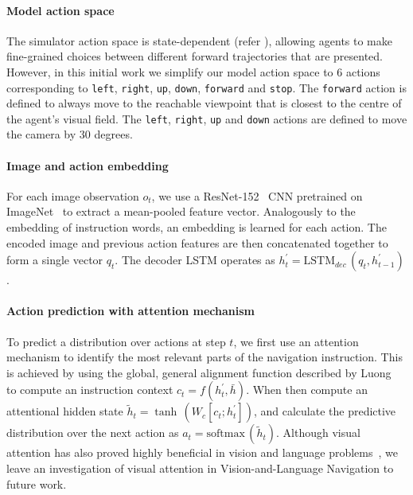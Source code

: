 \documentclass[10pt,twocolumn,letterpaper]{article}
\begin{document}
\vspace{-0.3cm}
\paragraph{Model action space}

The simulator action space is state-dependent (refer ), allowing agents to make fine-grained choices between different forward trajectories that are presented. However, in this initial work we simplify our model action space to 6 actions corresponding to \texttt{left}, \texttt{right}, \texttt{up}, \texttt{down}, \texttt{forward} and \texttt{stop}. The \texttt{forward} action is defined to always move to the reachable viewpoint that is closest to the centre of the agent's visual field. The \texttt{left}, \texttt{right}, \texttt{up} and \texttt{down} actions are defined to move the camera by 30 degrees.

\vspace{-0.3cm}
\paragraph{Image and action embedding}

For each image observation $o_t$, we use a ResNet-152~\cite{he2015deep} CNN pretrained on ImageNet~\cite{ILSVRC15} to extract a mean-pooled feature vector. Analogously to the embedding of instruction words, an embedding is learned for each action. The encoded image and previous action features are then concatenated together to form a single vector $q_t$. The decoder LSTM operates as $h^{'}_t= \textrm{LSTM}_{dec}\,(q_t,h^{'}_{t-1})$. 

\vspace{-0.3cm}
\paragraph{Action prediction with attention mechanism}

To predict a distribution over actions at step $t$, we first use an attention mechanism to identify the most relevant parts of the navigation instruction. This is achieved by using the global, general alignment function described by Luong \etal~\cite{luong2015effective} to compute an instruction context $c_t = f(h^{'}_t, \bar{h})$. When then compute an attentional hidden state $\tilde{h}_t = \tanh\,(W_c[c_t;h^{'}_t])$, and calculate the predictive distribution over the next action as $a_t = \textrm{softmax}\,(\tilde{h}_t)$. Although visual attention has also proved highly beneficial in vision and language problems~\cite{stacked,coatt,Anderson2017up-down}, we leave an investigation of visual attention in Vision-and-Language Navigation to future work. 
\end{document}
